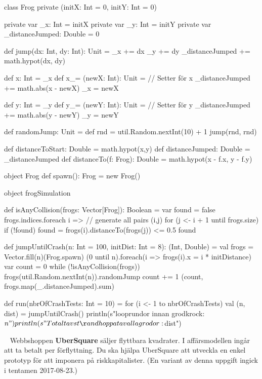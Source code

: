 \SubtaskSolved
\begin{Code}

class Frog private (initX: Int = 0, initY: Int = 0) {
	private var _x: Int = initX
	private var _y: Int = initY
	private var _distanceJumped: Double = 0

	def jump(dx: Int, dy: Int): Unit = {
		_x += dx
		_y += dy
		_distanceJumped += math.hypot(dx, dy)
	}

	def x: Int = _x
  def x_= (newX: Int): Unit = { // Setter för x
		_distanceJumped += math.abs(x - newX)
		_x = newX
	}

  def y: Int = _y
	def y_= (newY: Int): Unit = { // Setter för y
		_distanceJumped += math.abs(y - newY)
		_y = newY
	}


	def randomJump: Unit = {
		def rnd = util.Random.nextInt(10) + 1
		jump(rnd, rnd)
	}

	def distanceToStart: Double = math.hypot(x,y)
	def distanceJumped: Double = _distanceJumped
	def distanceTo(f: Frog): Double = math.hypot(x - f.x, y - f.y)
}

object Frog {
	def spawn(): Frog = new Frog()
}

\end{Code}

\SubtaskSolved
\begin{Code}
object frogSimulation {
  def isAnyCollision(frogs: Vector[Frog]): Boolean = {
    var found = false
    frogs.indices.foreach { i =>  // generate all pairs (i,j)
      for (j <- i + 1 until frogs.size)
        if (!found) found = frogs(i).distanceTo(frogs(j)) <= 0.5
    }
    found
  }

  def jumpUntilCrash(n: Int = 100, initDist: Int = 8): (Int, Double) = {
    val frogs = Vector.fill(n)(Frog.spawn)
    (0 until n).foreach(i => frogs(i).x = i * initDistance)
    var count = 0
    while (!isAnyCollision(frogs)) {
      frogs(util.Random.nextInt(n)).randomJump
    	count += 1
    }
    (count, frogs.map(_.distanceJumped).sum)
  }

  def run(nbrOfCrashTests: Int = 10) = for (i <- 1 to nbrOfCrashTests) {
    val (n, dist) = jumpUntilCrash()
    println(s"\nAntalet looprundor innan grodkrock: $n")
    println(s"Totalt avstånd hoppat av alla grodor: $dist")
  }
}
\end{Code}

\QUESTEND




\QUESTBEGIN

\Task  \what~  Webbshoppen \textbf{UberSquare} säljer flyttbara kvadrater. I affärsmodellen ingår att ta betalt per förflyttning. Du ska hjälpa UberSquare att utveckla en enkel prototyp för att imponera på riskkapitalister. (En variant av denna uppgift ingick i tentamen 2017-08-23.)

